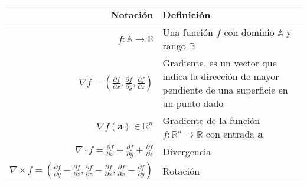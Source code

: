 \begin{table}[H]
    \begin{center}
        \begin{tabularx}{\textwidth}{|r|X|}
            \hline
            \textbf{Notación}                                                                                                                                                                                                                 & \textbf{Definición}                                                                                   \\
            \hline
            $ f: \mathbb{A} \rightarrow \mathbb{B} $                                                                                                                                                                                          & Una función $f$ con dominio $\mathbb{A}$ y rango $\mathbb{B}$                                         \\
            $ \nabla f = \left( \frac{\partial f}{\partial x}, \frac{\partial f}{\partial y}, \frac{\partial f}{\partial z} \right) $                                                                                                         & Gradiente, es un vector que indica la dirección de mayor pendiente de una superficie en un punto dado \\
            $ \nabla f(\mathbf{a}) \in \mathbb{R}^{n} $                                                                                                                                                                                       & Gradiente de la función $f: \mathbb{R}^{n} \rightarrow \mathbb{R}$ con entrada $\mathbf{a}$           \\
            $ \nabla \cdot f =  \frac{\partial f}{\partial x} + \frac{\partial f}{\partial y} + \frac{\partial f}{\partial z} $                                                                                                               & Divergencia                                                                                           \\
            $ \nabla \times f =  \left( \frac{\partial f}{\partial y} - \frac{\partial f}{\partial z}, \frac{\partial f}{\partial z} - \frac{\partial f}{\partial x}, \frac{\partial f}{\partial x} - \frac{\partial f}{\partial y}  \right)$ & Rotación                                                                                              \\

\end{tabularx}
\end{center}
\end{table}
